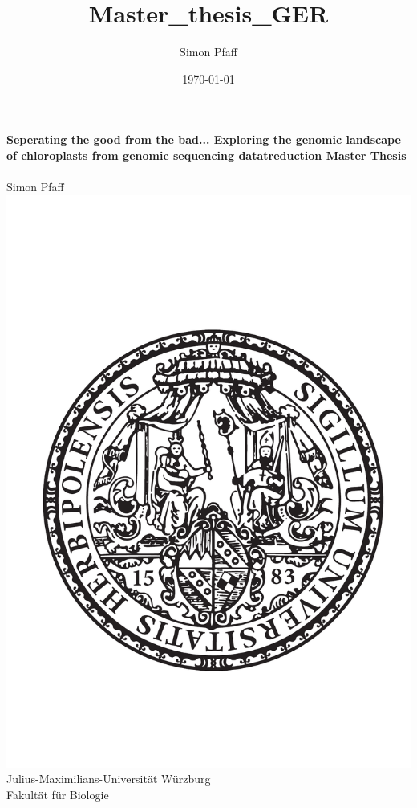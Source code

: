 \documentclass{scrartcl}
\author{Simon Pfaff}
\date{\today}
\title{Master\_thesis\_GER}
\begin{document}
\begin{center}
\thispagestyle{empty}
\textbf{\huge Seperating the good from the bad... Exploring the genomic landscape of chloroplasts from genomic sequencing datatreduction Master Thesis}\\[1cm]
\textbf{\LARGE }\\[1cm]
{\LARGE Simon Pfaff}\\[2mm]
\includegraphics[width=.7\linewidth]{./neuSIEGEL.pdf}
{\large Julius-Maximilians-Universität Würzburg}\\[3mm]
{\large Fakultät für Biologie}
\end{center}
\cleardoublepage
\
\thispagestyle{empty}
\maketitle
\end{document}
